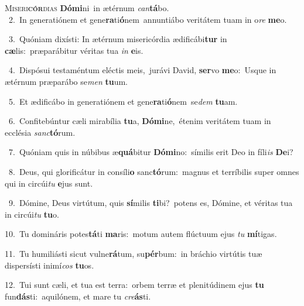 \lettrine{\initial\textcolor{\initialcolor}{M}}{iseri\-\textbf{cór}\-dias} \textbf{Dó}\-\textbf{mi}ni~\star in ætérnum \textit{can}\-\textbf{tá}bo.\\
{\numbfont\textcolor{\numbcolor}{~2.}}~In generatiónem et gene\-\textbf{ra}\-ti\-\textbf{ó}\-nem~\star annuntiábo veritátem tuam in o\textit{re} \textbf{me}\-o.\par
{\numbfont\textcolor{\numbcolor}{~3.}}~Quóniam dixísti: In ætérnum misericórdia ædificábi\textbf{tur} in \textbf{cæ}\-lis:~\star præparábitur véritas tua \textit{in} \textbf{e}\-is.\par
{\numbfont\textcolor{\numbcolor}{~4.}}~Dispósui testaméntum eléctis meis,~\dagger jurávi David, \textbf{ser}\-vo \textbf{me}\-o:~\star Usque in ætérnum præparábo se\textit{men} \textbf{tu}\-um.\par
{\numbfont\textcolor{\numbcolor}{~5.}}~Et ædificábo in generatiónem et gene\-\textbf{ra}\-ti\-\textbf{ó}\-nem~\star se\textit{dem} \textbf{tu}\-am.\par
{\numbfont\textcolor{\numbcolor}{~6.}}~Confitebúntur cæli mirabília \textbf{tu}\-a, \textbf{Dó}\-\textbf{mi}ne,~\star étenim veritátem tuam in ecclésia \textit{sanc}\-\textbf{tó}rum.\par
{\numbfont\textcolor{\numbcolor}{~7.}}~Quóniam quis in núbibus æ\-\textbf{quá}\-bitur \textbf{Dó}\-\textbf{mi}no:~\star símilis erit Deo in fíli\textit{is} \textbf{De}\-i?\par
{\numbfont\textcolor{\numbcolor}{~8.}}~Deus, qui glorificátur in consíli\textbf{o} sanc\-\textbf{tó}\-rum:~\star magnus et terríbilis super omnes qui in circúi\textit{tu} \textbf{e}\-jus sunt.\par
{\numbfont\textcolor{\numbcolor}{~9.}}~Dómine, Deus virtútum, quis \textbf{sí}\-milis \textbf{ti}\-bi?~\star potens es, Dómine, et véritas tua in circúi\textit{tu} \textbf{tu}\-o.\par
{\numbfont\textcolor{\numbcolor}{10.}}~Tu domináris potes\-\textbf{tá}\-ti \textbf{ma}\-ris:~\star motum autem flúctuum ejus \textit{tu} \textbf{mí}\-tigas.\par
{\numbfont\textcolor{\numbcolor}{11.}}~Tu humiliásti sicut vulne\-\textbf{rá}\-tum, su\-\textbf{pér}\-bum:~\star in bráchio virtútis tuæ dispersísti inimí\textit{cos} \textbf{tu}\-os.\par
{\numbfont\textcolor{\numbcolor}{12.}}~Tui sunt cæli, et tua est terra:~\dagger orbem terræ et plenitúdinem ejus \textbf{tu} fun\-\textbf{dás}\-ti:~\star aquilónem, et mare tu \textit{cre}\-\textbf{ás}ti.\par
